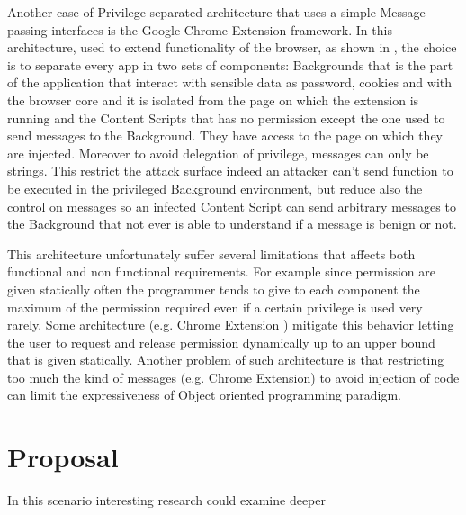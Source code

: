\documentclass[10pt,a4paper,draft]{article}
\begin{document}
Another case of Privilege separated architecture that uses a simple Message passing interfaces is the Google Chrome Extension framework. In this architecture, used to extend functionality of the browser, as shown in \cite{ChromeExtSpec,ChromeExtSpecSnd}, the choice is to separate every app in two sets of components: Backgrounds that is the part of the application that interact with sensible data as password, cookies and with the browser core and it is isolated from the page on which the extension is running and the Content Scripts that has no permission except the one used to send messages to the Background. They have access to the page on which they are injected. Moreover to avoid delegation of privilege, messages can only be strings. This restrict the attack surface indeed an attacker can't send function to be executed in the privileged Background environment, but reduce also the control on messages so an infected Content Script can send arbitrary messages to the Background that not ever is able to understand if a message is benign or not.

This architecture unfortunately suffer several limitations that affects both functional and non functional requirements. For example since permission are given statically often the programmer tends to give to each component the maximum of the permission required even if a certain privilege is used very rarely. Some architecture (e.g. Chrome Extension \cite{ChromeExtensionOnline}) mitigate this behavior letting the user to request and release permission dynamically up to an upper bound that is given statically. Another problem of such architecture is that restricting too much the kind of messages (e.g. Chrome Extension) to avoid injection of code can limit the expressiveness of Object oriented programming paradigm.

\section{Proposal}
In this scenario interesting research could examine deeper 




\end{document}
